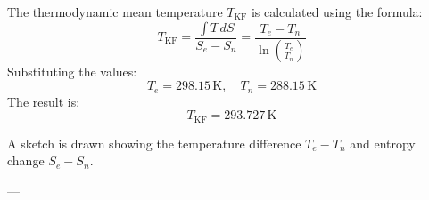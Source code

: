 The thermodynamic mean temperature \( T_{\text{KF}} \) is calculated using the formula:  
\[
T_{\text{KF}} = \frac{\int T \, dS}{S_e - S_n} = \frac{T_e - T_n}{\ln\left(\frac{T_e}{T_n}\right)}
\]  
Substituting the values:  
\[
T_e = 298.15 \, \text{K}, \quad T_n = 288.15 \, \text{K}
\]  
The result is:  
\[
T_{\text{KF}} = 293.727 \, \text{K}
\]  

A sketch is drawn showing the temperature difference \( T_e - T_n \) and entropy change \( S_e - S_n \).  

---
